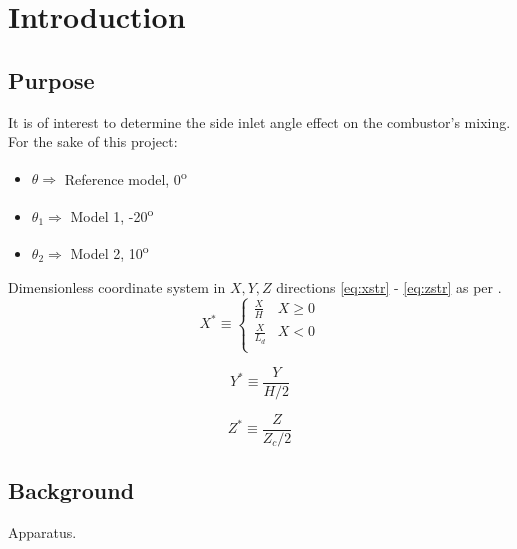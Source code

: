 \chapter{Introduction}
\label{ch:intro}

\section{Purpose}
\label{sect:purpose}
It is of interest to determine the side inlet angle effect on the combustor's mixing. For the sake of this project:

\begin{itemize}
\item $\theta \Rightarrow$ Reference model, 0\textsuperscript{o} 
\item $\theta_1 \Rightarrow$ Model 1, -20\textsuperscript{o} 
\item $\theta_2 \Rightarrow$ Model 2, 10\textsuperscript{o}\\
\end{itemize}

Dimensionless coordinate system in $X,Y,Z$ directions \ref{eq:xstr} - \ref{eq:zstr} as per \cite{art}.
\begin{equation}
	X^* \equiv
	\begin{cases}
 		\frac{X}{H} & X\geq 0\\
		\frac{X}{L_d} & X < 0\\
	\end{cases}
	\label{eq:xstr}
\end{equation}

\begin{equation}
	\label{eq:ystr}
	Y^* \equiv \frac{Y}{H/2}
\end{equation}

\begin{equation}
	\label{eq:zstr}
	Z^* \equiv \frac{Z}{Z_c /2}
\end{equation}

\section{Background}
\label{sect:background}
Apparatus. \\

